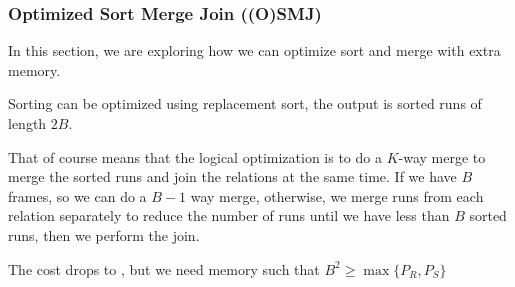 \subsubsection{Optimized Sort Merge Join ((O)SMJ)}
In this section, we are exploring how we can optimize sort and merge with extra memory.

Sorting can be optimized using replacement sort, the output is  sorted runs of length $2B$.

That of course means that the logical optimization is to do a $K$-way merge to merge the sorted runs and join the relations at the same time.
If we have $B$ frames, so we can do a $B-1$ way merge, otherwise, we merge runs from each relation separately to reduce the number of runs
until we have less than $B$ sorted runs, then we perform the join.

The cost drops to , but we need memory such that $B^2 \geq \max\{ P_R, P_S \}$
